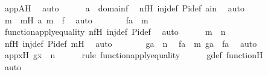 \begin{isabellebody}
\ appAH\ \isamarkupfalse%
\ auto\isanewline
\ \ \ \ \isamarkupfalse%
\ {\isachardoublequoteopen}a\ {\isasymin}\ domain{\isacharparenleft}{\kern0pt}f{\isacharparenright}{\kern0pt}{\isachardoublequoteclose}\ \isamarkupfalse%
\ nfH\ inj{\isacharunderscore}{\kern0pt}def\ Pi{\isacharunderscore}{\kern0pt}def\ ain\ \isamarkupfalse%
\ auto\isanewline
\ \ \ \ \isamarkupfalse%
\ \isamarkupfalse%
\ m\ \ mH{\isacharcolon}{\kern0pt}\ {\isachardoublequoteopen}{\isacharless}{\kern0pt}a{\isacharcomma}{\kern0pt}\ m{\isachargreater}{\kern0pt}\ {\isasymin}\ f{\isachardoublequoteclose}\ \isamarkupfalse%
\ auto\isanewline
\ \ \ \ \isamarkupfalse%
\ \isamarkupfalse%
\ {\isachardoublequoteopen}f{\isacharbackquote}{\kern0pt}a\ {\isacharequal}{\kern0pt}\ m{\isachardoublequoteclose}\ \isamarkupfalse%
\ function{\isacharunderscore}{\kern0pt}apply{\isacharunderscore}{\kern0pt}equality\ nfH\ inj{\isacharunderscore}{\kern0pt}def\ Pi{\isacharunderscore}{\kern0pt}def\ \isamarkupfalse%
\ auto\isanewline
\ \ \ \ \isamarkupfalse%
\ {\isachardoublequoteopen}m\ {\isasymin}\ n{\isachardoublequoteclose}\ \isamarkupfalse%
\ nfH\ inj{\isacharunderscore}{\kern0pt}def\ Pi{\isacharunderscore}{\kern0pt}def\ mH\ \isamarkupfalse%
\ auto\isanewline
\ \ \ \ \isamarkupfalse%
\ \isamarkupfalse%
\ {\isachardoublequoteopen}g{\isacharbackquote}{\kern0pt}a\ {\isasymin}\ n{\isachardoublequoteclose}\ \isamarkupfalse%
\ {\isacartoucheopen}f{\isacharbackquote}{\kern0pt}a\ {\isacharequal}{\kern0pt}\ m{\isacartoucheclose}\ {\isacartoucheopen}g{\isacharbackquote}{\kern0pt}a\ {\isacharequal}{\kern0pt}\ f{\isacharbackquote}{\kern0pt}a{\isacartoucheclose}\ \isamarkupfalse%
\ auto\isanewline
\ \ \isamarkupfalse%
\ \ \ \ \isanewline
\isanewline
\ \ \isamarkupfalse%
\ appxH{\isacharcolon}{\kern0pt}\ {\isachardoublequoteopen}g{\isacharbackquote}{\kern0pt}x\ {\isacharequal}{\kern0pt}\ n{\isachardoublequoteclose}\ \isanewline
\ \ \ \ \isamarkupfalse%
{\isacharparenleft}{\kern0pt}rule\ function{\isacharunderscore}{\kern0pt}apply{\isacharunderscore}{\kern0pt}equality{\isacharparenright}{\kern0pt}\isanewline
\ \ \ \ \isamarkupfalse%
\ g{\isacharunderscore}{\kern0pt}def\ functionH\isanewline
\ \ \ \ \isamarkupfalse%
\ auto\isanewline

\end{isabellebody}
